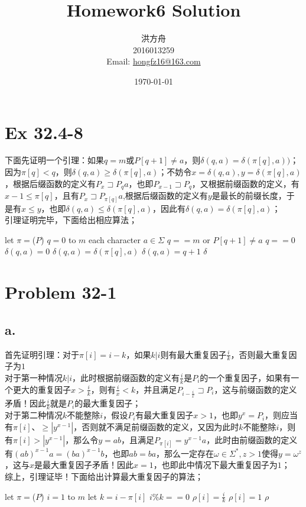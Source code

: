 \documentclass{article}
\title{Homework6 Solution}
\author{洪方舟\\2016013259\\Email: \href{mailto:hongfz16@163.com}{hongfz16@163.com}}
\date{\today}
\begin{document}
  \maketitle
  \setlength\parindent{0em}
  \section*{Ex 32.4-8}
  	下面先证明一个引理：如果$q=m$或$P[q+1] \neq a$，则$\delta(q,a)=\delta(\pi[q],a))$；\\
  	因为$\pi[q]<q$，则$\delta(q,a)\geq \delta(\pi[q],a)$；不妨令$x=\delta(q,a), y=\delta(\pi[q],a)$，根据后缀函数的定义有$P_x\sqsupset P_qa$，也即$P_{x-1} \sqsupset P_q$，又根据前缀函数的定义，有$x-1 \leq \pi[q]$，且有$P_x \sqsupset P_{\pi[q]}a$,根据后缀函数的定义有$y$是最长的前缀长度，于是有$x\leq y$，也即$\delta(q,a)\leq \delta(\pi[q],a)$，因此有$\delta(q,a) = \delta(\pi[q],a)$；\\
  	引理证明完毕，下面给出相应算法；
  	\begin{codebox}
  		\li let $\pi=$($P$)
  		\li \For $q=0$ to $m$
  		\li \Do \For each character $a \in \Sigma$
  		\li \Do \If $q==m$ or $P[q+1]\neq a$
  		\li \Then \If $q==0$
  		\li \Then $\delta(q,a)=0$
  		\li \Else $\delta(q,a)=\delta(\pi[q],a)$
  		\End
  		\li \Else $\delta(q,a)=q+1$
  		\End
  		\End
  		\End
  		\li {} $\delta$
  	\end{codebox}
  \section*{Problem 32-1}
  	\subsection*{a.}
  		首先证明引理：对于$\pi[i]=i-k$，如果$k|i$则有最大重复因子$\frac{i}{k}$，否则最大重复因子为$1$\\
  		对于第一种情况$k|i$，此时根据前缀函数的定义有$\frac{i}{k}$是$P_i$的一个重复因子，如果有一个更大的重复因子$x>\frac{i}{k}$，则有$\frac{i}{x}<k$，并且满足$P_{i-\frac{i}{x}} \sqsupset P_i$，这与前缀函数的定义矛盾！因此$\frac{i}{k}$就是$P_i$的最大重复因子；\\
  		对于第二种情况$k$不能整除$i$，假设$P_i$有最大重复因子$x>1$，也即$y^x=P_i$，则应当有$\pi[i]、\geq |y^{x-1}|$，否则就不满足前缀函数的定义，又因为此时$k$不能整除$i$，则有$\pi[i]>|y^{x-1}|$，那么令$y=ab$，且满足$P_{\pi[i]}=y^{x-1}a$，此时由前缀函数的定义有$(ab)^{x-1}a=(ba)^{x-1}b$，也即$ab=ba$，那么一定存在$\omega \in \Sigma^*,z>1$使得$y=\omega^z$，这与$x$是最大重复因子矛盾！因此$x=1$，也即此中情况下最大重复因子为$1$；\\
  		综上，引理证毕！下面给出计算最大重复因子的算法；
  		\begin{codebox}
  			\li let $\pi=$($P$)
  			\li \For $i=1$ to $m$
  			\li \Do let $k=i-\pi[i]$
  			\li \If $i\%k==0$
  			\li \Then $\rho[i]=\frac{i}{k}$
  			\li \Else $\rho[i]=1$
  			\End \End
  			\li {} $\rho$
  		\end{codebox}
\end{document}
